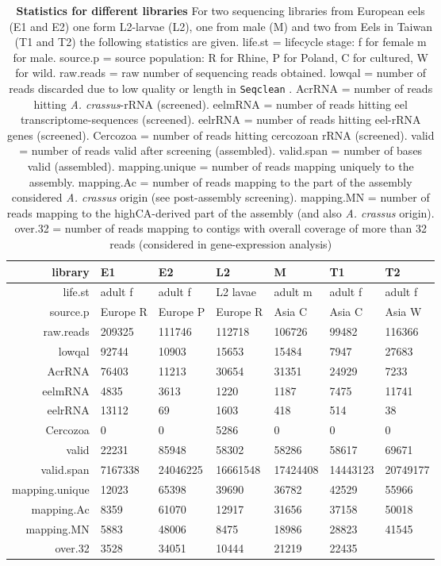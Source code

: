\begin{table}[!h]
\begin{tabular}{rllllll}
   \hline
library & E1 & E2 & L2 & M & T1 & T2 \\ 
   \hline
life.st & adult f & adult f & L2 lavae & adult m & adult f & adult f \\ 
  source.p & Europe R & Europe P & Europe R & Asia C & Asia C & Asia W \\ 
  raw.reads & 209325 & 111746 & 112718 & 106726 & 99482 & 116366 \\ 
  lowqal & 92744 & 10903 & 15653 & 15484 & 7947 & 27683 \\ 
  AcrRNA & 76403 & 11213 & 30654 & 31351 & 24929 & 7233 \\ 
  eelmRNA & 4835 & 3613 & 1220 & 1187 & 7475 & 11741 \\ 
  eelrRNA & 13112 & 69 & 1603 & 418 & 514 & 38 \\ 
  Cercozoa & 0 & 0 & 5286 & 0 & 0 & 0 \\ 
  valid & 22231 & 85948 & 58302 & 58286 & 58617 & 69671 \\ 
  valid.span & 7167338 & 24046225 & 16661548 & 17424408 & 14443123 & 20749177 \\ 
  mapping.unique & 12023 & 65398 & 39690 & 36782 & 42529 & 55966 \\ 
  mapping.Ac &  8359 & 61070 & 12917 & 31656 & 37158 & 50018 \\ 
  mapping.MN &  5883 & 48006 &  8475 & 18986 & 28823 & 41545 \\ 
  over.32 &  3528 & 34051 & 10444 & 21219 & 22435 \\ 
  \hline
\end{tabular}
\caption[Pyro-sequencing library statistics]{\textbf{Statistics for different 
    libraries} 
  For two sequencing libraries from European eels (E1 and E2)
  one form L2-larvae (L2), one from male (M) and two from Eels in Taiwan
  (T1 and T2) the following statistics are given. life.st = lifecycle
  stage: f for female m for male. source.p = source population: R for
  Rhine, P for Poland, C for cultured, W for wild. raw.reads = raw
  number of sequencing reads obtained. lowqal = number of reads
  discarded due to low quality or length in \texttt{Seqclean}
  \cite{tgicl_pertea}. AcrRNA = number of reads hitting
  \textit{A. crassus}-rRNA (screened). eelmRNA = number of reads hitting
  eel transcriptome-sequences (screened). eelrRNA = number of reads
  hitting eel-rRNA genes (screened). Cercozoa = number of reads hitting
  cercozoan rRNA (screened). valid = number of reads valid after
  screening (assembled). valid.span = number of bases valid (assembled).
  mapping.unique = number of reads mapping uniquely to the
  assembly. mapping.Ac = number of reads mapping to the part of the
  assembly considered \textit{A. crassus} origin (see post-assembly
  screening). mapping.MN = number of reads mapping to the highCA-derived
  part of the assembly (and also \textit{A. crassus} origin). over.32 =
  number of reads mapping to contigs with overall coverage of more than
  32 reads (considered in gene-expression analysis)}
  \label{screening-lib}
\end{table}

